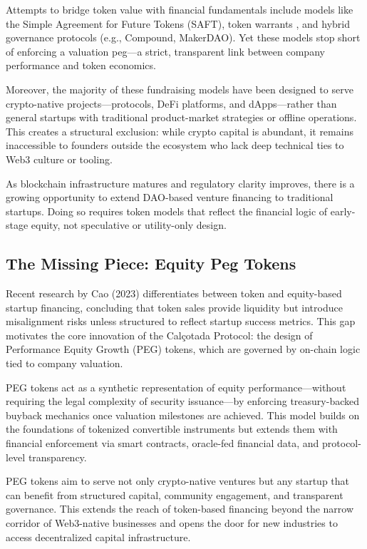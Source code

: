 \documentclass[conference]{IEEEtran}
\begin{document}
Attempts to bridge token value with financial fundamentals include models like the Simple Agreement for Future Tokens (SAFT), token warrants \cite{lw2019token}, and hybrid governance protocols (e.g., Compound, MakerDAO). Yet these models stop short of enforcing a valuation peg—a strict, transparent link between company performance and token economics.

Moreover, the majority of these fundraising models have been designed to serve crypto-native projects—protocols, DeFi platforms, and dApps—rather than general startups with traditional product-market strategies or offline operations. This creates a structural exclusion: while crypto capital is abundant, it remains inaccessible to founders outside the ecosystem who lack deep technical ties to Web3 culture or tooling.

As blockchain infrastructure matures and regulatory clarity improves, there is a growing opportunity to extend DAO-based venture financing to traditional startups. Doing so requires token models that reflect the financial logic of early-stage equity, not speculative or utility-only design.

\subsection{The Missing Piece: Equity Peg Tokens}

Recent research by Cao (2023) \cite{cao2023token} differentiates between token and equity-based startup financing, concluding that token sales provide liquidity but introduce misalignment risks unless structured to reflect startup success metrics. This gap motivates the core innovation of the Calçotada Protocol: the design of Performance Equity Growth (PEG) tokens, which are governed by on-chain logic tied to company valuation.

PEG tokens act as a synthetic representation of equity performance—without requiring the legal complexity of security issuance—by enforcing treasury-backed buyback mechanics once valuation milestones are achieved. This model builds on the foundations of tokenized convertible instruments but extends them with financial enforcement via smart contracts, oracle-fed financial data, and protocol-level transparency.

PEG tokens aim to serve not only crypto-native ventures but any startup that can benefit from structured capital, community engagement, and transparent governance. This extends the reach of token-based financing beyond the narrow corridor of Web3-native businesses and opens the door for new industries to access decentralized capital infrastructure.
\end{document}
